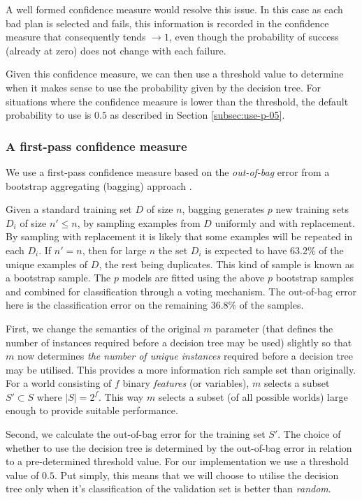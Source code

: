 \documentclass[a4paper]{article}
\newcommand{\dt}{{decision tree}\xspace}
\begin{document}
A well formed confidence measure would resolve this issue. In this case as each bad plan is selected and fails, this information is recorded in the confidence measure that consequently tends $\to 1$, even though the probability of success (already at zero) does not change with each failure.

Given this confidence measure, we can then use a threshold value to determine when it makes sense to use the probability given by the \dt. For situations where the confidence measure is lower than the threshold, the default probability to use is $0.5$ as described in Section \ref{subsec:use-p-05}.


\subsubsection{A first-pass confidence measure}
\label{subsubsec:confidence-measure}

We use a first-pass confidence measure based on the \textit{out-of-bag} error from a bootstrap aggregating (bagging) approach \cite{breiman1996baggi}. 

Given a standard training set $D$ of size $n$, bagging generates $p$ new training sets $D_i$ of size $n' \le n$, by sampling examples from $D$ uniformly and with replacement. By sampling with replacement it is likely that some examples will be repeated in each $D_i$. If $n'=n$, then for large $n$ the set $D_i$ is expected to have 63.2\% of the unique examples of $D$, the rest being duplicates. This kind of sample is known as a bootstrap sample. The $p$ models are fitted using the above $p$ bootstrap samples and combined for classification through a voting mechanism. The out-of-bag error here is the classification error on the remaining 36.8\% of the samples.

First, we change the semantics of the original $m$ parameter (that defines the number of instances required before a \dt may be used) slightly so that $m$ now determines \textit{the number of unique instances} required before a \dt may be utilised. This provides a more information rich sample set than originally. For a world consisting of $f$ binary \textit{features} (or variables), $m$ selects a subset $S' \subset S$ where $|S| = 2^f$. This way $m$ selects a subset (of all possible worlds) large enough to provide suitable performance. 

Second, we calculate the out-of-bag error for the training set $S'$. The choice of whether to use the \dt is determined by the out-of-bag error in relation to a pre-determined threshold value. For our implementation we use a threshold value of $0.5$. Put simply, this means that we will choose to utilise the \dt only when it's classification of the validation set is better than \textit{random}.
\end{document}
